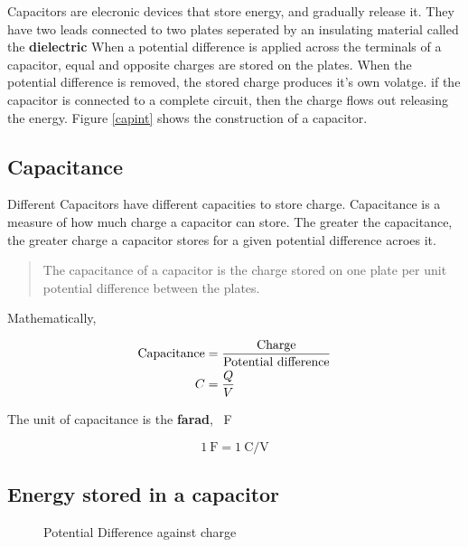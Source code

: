 \documentclass{scrbook}
\begin{document}
	Capacitors are elecronic devices that store energy, and gradually release it. They have two leads connected to two plates seperated by an insulating material called the \textbf{dielectric} When a potential difference is applied across the terminals of a capacitor, equal and opposite charges are stored on the plates. When the potential difference is removed, the stored charge produces it's own volatge. if the capacitor is connected to a complete circuit, then the charge flows out releasing the energy. Figure \ref{capint} shows the construction of a capacitor.

\subsection{Capacitance}

	Different Capacitors have different capacities to store charge. Capacitance is a measure of how much charge a capacitor can store. The greater the capacitance, the greater charge a capacitor stores for a given potential difference acroes it.

	\begin{quote}
		The capacitance of a capacitor is the charge stored on one plate per unit potential difference between the plates.
	\end{quote}

	Mathematically,

	\begin{align}
		\text{Capacitance} &= \frac{\text{Charge}}{\text{Potential difference}} \notag \\
		C &= \frac{Q}{V} \label{capacitanceeq}
	\end{align}

	The unit of capacitance is the \textbf{farad}, \SI{}{\farad}

	\[ \SI{1}{\farad} = \SI{1}{\coulomb\per\volt} \]

\subsection{Energy stored in a capacitor}

	\begin{figure}
	\caption{Potential Difference against charge}
	\centering
	\label{pdvcap}
	\end{figure}
	
\end{document}
